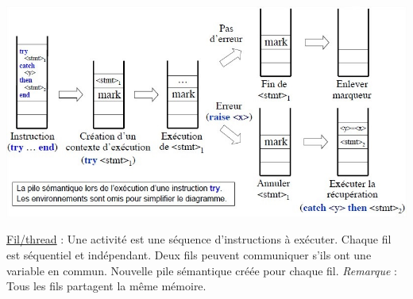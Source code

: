 \documentclass[fr,license=none,skiptoc]{../../../eplsummary}
\begin{document}
\begin{flushleft}
\begin{center}
\includegraphics[scale=0.7]{Exc.jpg}
\end{center}
\bigbreak


\textcolor{mauvedef}{\underline{Fil/thread}} : Une activité est une séquence d’instructions à exécuter. Chaque fil est séquentiel et indépendant. Deux fils peuvent communiquer s'ils ont une variable en commun. Nouvelle pile sémantique créée pour chaque fil. \textit{Remarque} : Tous les fils partagent la même mémoire. 


\end{flushleft}
\end{document}
